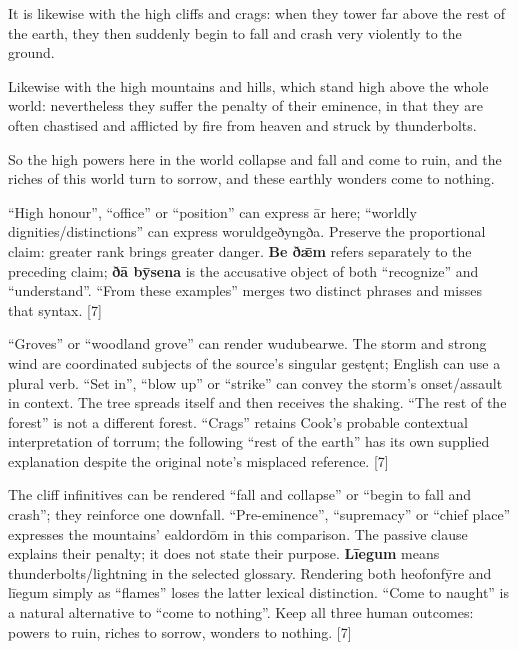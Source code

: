 It is likewise with the high cliffs and crags: when they tower far above the rest of the earth, they then suddenly begin to fall and crash very violently to the ground.

Likewise with the high mountains and hills, which stand high above the whole world: nevertheless they suffer the penalty of their eminence, in that they are often chastised and afflicted by fire from heaven and struck by thunderbolts.

So the high powers here in the world collapse and fall and come to ruin, and the riches of this world turn to sorrow, and these earthly wonders come to nothing.

“High honour”, “office” or “position” can express ār here; “worldly dignities/\allowbreak{}distinctions” can express woruldgeðyngða. Preserve the proportional claim: greater rank brings greater danger. \textbf{Be ðǣm} refers separately to the preceding claim; \textbf{ðā bȳsena} is the accusative object of both “recognize” and “understand”. “From these examples” merges two distinct phrases and misses that syntax. [7]

“Groves” or “woodland grove” can render wudubearwe. The storm and strong wind are coordinated subjects of the source's singular gestęnt; English can use a plural verb. “Set in”, “blow up” or “strike” can convey the storm's onset/\allowbreak{}assault in context. The tree spreads itself and then receives the shaking. “The rest of the forest” is not a different forest. “Crags” retains Cook's probable contextual interpretation of torrum; the following “rest of the earth” has its own supplied explanation despite the original note's misplaced reference. [7]

The cliff infinitives can be rendered “fall and collapse” or “begin to fall and crash”; they reinforce one downfall. “Pre-eminence”, “supremacy” or “chief place” expresses the mountains' ealdordōm in this comparison. The passive clause explains their penalty; it does not state their purpose. \textbf{Līegum} means thunderbolts/\allowbreak{}lightning in the selected glossary. Rendering both heofonfȳre and līegum simply as “flames” loses the latter lexical distinction. “Come to naught” is a natural alternative to “come to nothing”. Keep all three human outcomes: powers to ruin, riches to sorrow, wonders to nothing. [7]

